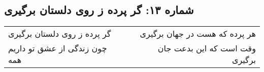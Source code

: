 \begin{center}
\section*{شماره ۱۳: گر پرده ز روی دلستان برگیری}
\label{sec:013}
\begin{longtable}{l p{0.5cm} r}
گر پرده ز روی دلستان برگیری
&&
هر پرده که هست در جهان برگیری
\\
چون زندگی از عشق تو داریم همه
&&
وقت است که این بدعت جان برگیری
\\
\end{longtable}
\end{center}
